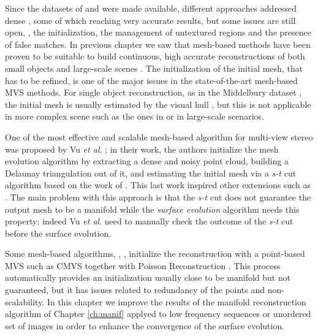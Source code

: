 Since the datasets of \cite{seitz_et_al06} and \cite{strecha2008} were made available, different approaches addressed dense \mvs, some of which reaching very accurate results, but some issues are still open, \eg, the initialization, the management of untextured regions and the presence of false matches.
In previous chapter we saw that mesh-based methods have been proven to be suitable to build continuous, high accurate reconstructions of both small objects and large-scale scenes \cite{hiep2009towards,vu_et_al_2012,salman2010surface}. 
The initialization of the initial mesh, that has to be refined, is one of the major issues in the state-of-the-art mesh-based MVS methods. For single object reconstruction, as in the Middelbury dataset \cite{seitz_et_al06}, the initial mesh is usually estimated by the visual hull \cite{laurentini1994visual}, but this is not applicable in more complex scene such as the ones in \cite{strecha2008} or in large-scale scenarios.

One of the most effective and scalable mesh-based algorithm for multi-view stereo was proposed by Vu \emph{et al}. \cite{vu_et_al_2012}; in their work, the authors initialize the mesh evolution algorithm by extracting a dense and noisy point cloud, building a Delaunay triangulation out of it, and estimating the initial mesh via a \emph{s-t} cut algorithm based on the work of \cite{labatut2007efficient}. 
This last work inspired other extensions such as \cite{jancosek2011multi}.
The main problem with this approach is that the \emph{s-t} cut does not guarantee the output mesh to be a manifold while the \emph{surface evolution} algorithm needs this property; indeed Vu \emph{et al}.  need to manually check the outcome of the \emph{s-t} cut before the surface evolution.

Some mesh-based algorithms, \eg, \cite{pan2015automatic,li2015detail}, initialize the reconstruction with a point-based MVS such as CMVS \cite{fu10} together with Poisson Reconstruction \cite{kazhdan2006poisson}.
This process automatically provides an initialization usually close to be manifold but not guaranteed, but it has issues related to redundancy of the points and non-scalability.
In this chapter we improve the results of the manifold reconstruction algorithm of Chapter {\ref{ch:manif}} applyed to low frequency sequences or unordered set of images in order to enhance the convergence of the surface evolution.

